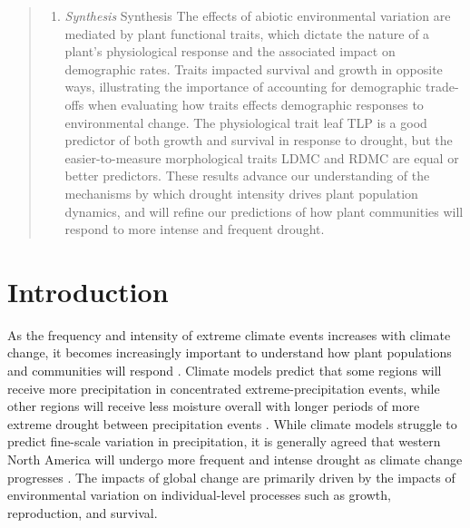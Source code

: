 \documentclass[12pt, letterpaper]{article}
\begin{document}
\begin{abstract}
\begin{enumerate}
\item \textit{Synthesis} Synthesis The effects of abiotic environmental variation  are  mediated  by  plant functional traits,  which  dictate  the  nature  of  a plant’s physiological response and the associated impact on demographic rates. Traits impacted survival and growth in opposite ways, illustrating the importance of accounting for  demographic trade-offs when evaluating how traits effects demographic responses to environmental change. The physiological trait leaf TLP is a good predictor of both growth and survival in response to drought, but the easier-to-measure morphological traits LDMC and RDMC are equal or better predictors. These results advance our understanding of the mechanisms by which drought intensity drives plant population dynamics, and will refine our predictions of how plant communities will respond to more intense and frequent drought.
\end{enumerate}
\end{abstract}

\section{Introduction}
As the frequency and intensity of extreme climate events increases with climate change, it becomes increasingly important to understand how plant populations and communities will respond \citep{Vicente-Serrano2020AWarming}. Climate models predict that some regions will receive more precipitation in concentrated extreme-precipitation events, while other regions will receive less moisture overall with longer periods of more extreme drought between precipitation events \citep{Knapp2008ConsequencesEcosystems}. While climate models struggle to predict fine-scale variation in precipitation, it is generally agreed that western North America will undergo more frequent and intense drought as climate change progresses \citep{Hartmann2013}. The impacts of global change are primarily driven by the impacts of environmental variation on individual-level processes such as growth, reproduction, and survival.  
\end{document}
